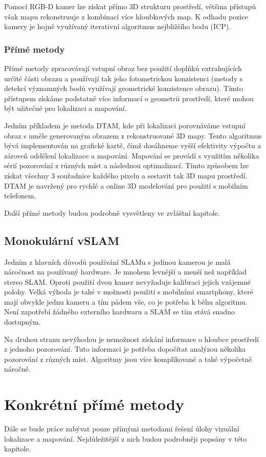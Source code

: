 \documentclass[12pt,a4paper]{article}
\begin{document}
Pomocí RGB-D kamer lze získat přímo 3D strukturu prostředí, většina přístupů však mapu rekonstruuje z kombinací více hloubkových map. K odhadu pozice kamery je hojně využívaný iterativní algoritmus nejbližšího bodu (ICP). 

\subsubsection{Přímé metody}
Přímé metody zpracovávají vstupní obraz bez použití doplňků extrahujících určité části obrazu a používají tak jeho fotometrickou konzistenci (metody s detekcí významných bodů využívají geometrické konzistence obrazu). Tímto přístupem získáme podstatně více informací o geometrii prostředí, které mohou být užitečné pro lokalizaci a mapování.

Jedním příkladem je metoda DTAM, kde při lokalizaci porovnáváme vstupní obraz s uměle generovaným obrazem z rekonstruované 3D mapy. Tento algoritmus bývá implementován na grafické kartě, čímž dosáhneme vyšší efektivity výpočtu a zároveň oddělení lokalizace a mapování. Mapování se provádí s využitím několika sérií pozorování z různých míst a následnou optimalizací. Tímto způsobem lze získat všechny 3 souřadnice každého pixelu a sestavit tak 3D mapu prostředí. DTAM je navržený pro rychlé a online 3D modelování pro použití s mobilním telefonem.

Další přímé metody budou podrobně vysvětleny ve zvláštní kapitole.

\subsection{Monokulární vSLAM}
Jedním z hlavních důvodů používání SLAMu s jedinou kamerou je malá náročnost na používaný hardware. Je mnohem levnější a menší než například stereo SLAM. Oproti použití dvou kamer nevyžaduje kalibraci jejich vzájemné polohy. Velká výhoda je také v možnosti použití s mobilními smartphony, které mají obvykle jednu kameru a tím pádem vše, co je potřeba k běhu algoritmu. Není zapotřebí žádného externího hardwaru a SLAM se tím stává snadno dostupným.

Na druhou stranu nevýhodou je nemožnost získání informace o hloubce prostředí z jednoho pozorování. Tuto informaci je potřeba dopočítat analýzou několika pozorování z různých míst. Algoritmy jsou více komplikované a také výpočetně náročné.

\section{Konkrétní přímé metody}
Dále se bude práce zabývat pouze přímými metodami řešení úlohy vizuální lokalizace a mapování. Nejdůležitější z nich budou podrobněji popsány v této kapitole.
\end{document}

